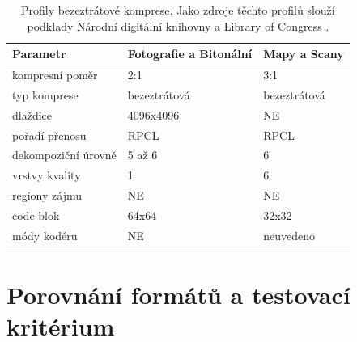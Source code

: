 \begin{table}[ht!]
\small
    \setlength{\tabcolsep}{3pt} %
    \renewcommand{\arraystretch}{1.5} %
    \begin{tabular}{|p{4.4cm}||p{5cm}|p{5cm}|}
      \hline
      \textbf{Parametr}             & \textbf{Fotografie a Bitonální}          & \textbf{Mapy a Scany} \\      
      \hline
      kompresní poměr               & 2:1                          & 3:1                \\ 
      typ komprese                  & bezeztrátová                 & bezeztrátová       \\ 
      dlaždice                      & 4096x4096                    & NE                 \\ 
      pořadí přenosu                & RPCL                         & RPCL               \\ 
      dekompoziční úrovně           & 5 až 6                       & 6                  \\ 
      vrstvy kvality                & 1                            & 6                  \\ 
      regiony zájmu                           & NE                           & NE                 \\ 
      code-blok                    & 64x64                        & 32x32              \\ 
      módy kodéru                 & NE                           & neuvedeno          \\ 
      \hline
    \end{tabular}
    \caption{Profily bezeztrátové komprese. Jako zdroje těchto profilů slouží podklady Národní digitální knihovny \cite{ndk} a Library of Congress \cite{cong}.} 
\end{table}


\newpage
\section{Porovnání formátů a testovací kritérium}

